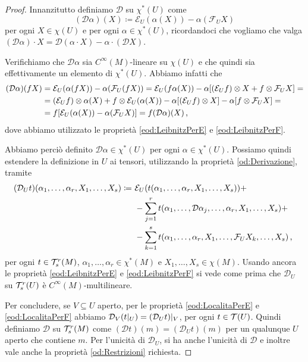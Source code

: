 \begin{proof}
	Innanzitutto definiamo $\mathcal D$ su $\chi^*(U)$ come 
	\begin{equation*}
	(\mathcal D\alpha) (X) \coloneqq \mathcal E_U(\alpha(X)) - \alpha( \mathcal F_UX)
	\end{equation*}
	per ogni $X\in\chi(U)$ e per ogni $\alpha \in \chi^*(U)$, ricordandoci che vogliamo che valga $(\mathcal D\alpha)\cdot X = \mathcal D(\alpha\cdot X) - \alpha\cdot(\mathcal D X)$.
	
	Verifichiamo che $\mathcal D\alpha$ sia $C^\infty(M)$-lineare su $\chi(U)$ e che quindi sia effettivamente un elemento di $\chi^*(U)$.
	Abbiamo infatti che
	\begin{align*}
		(\mathcal D\alpha)(fX) &= \mathcal E_U(\alpha(fX)) - \alpha(\mathcal F_U(fX))= \mathcal E_U(f\alpha (X)) - \alpha [(\mathcal E_Uf)\otimes X + f \otimes \mathcal F_UX] = \\
		&= (\mathcal E_U f)\otimes \alpha (X) + f \otimes \mathcal E_U (\alpha (X)) - \alpha [(\mathcal E_U f) \otimes X] - \alpha [f \otimes \mathcal F_U X] = \\
		&= f [\mathcal E_U (\alpha (X))- \alpha( \mathcal F_UX)] = f(\mathcal D\alpha) (X) \, \text{, }
	\end{align*}
	dove abbiamo utilizzato le proprietà \ref{eod:LeibnitzPerE} e \ref{eod:LeibnitzPerF}.
	
	Abbiamo perciò definito $\mathcal D\alpha \in \chi^*(U)$ per ogni $\alpha\in\chi^*(U)$. Possiamo quindi estendere la definizione in $U$ ai tensori, utilizzando la proprietà \ref{od:Derivazione}, tramite 
	\begin{align*} %
		(\mathcal D_U t) (\alpha_1,\ldots,\alpha_r,X_1,\ldots,X_s) \coloneqq\ & \mathcal E_U(t(\alpha_1,\ldots,\alpha_r,X_1,\ldots,X_s)) +\\
		&-\sum_{j=1}^rt(\alpha_1,\ldots, \mathcal D\alpha_j,\ldots,\alpha_r,X_1,\ldots,X_s) +\\
		&- \sum_{k=1}^s t(\alpha_1,\ldots,\alpha_r,X_1,\ldots,\mathcal F_UX_k,\ldots,X_s)\virgola
	\end{align*}
	per ogni $t\in\mathcal T_s^r(M)$, $\alpha_1,\ldots,\alpha_r\in\chi^*(M)$ e $X_1,\ldots,X_s\in\chi(M)$.
	Usando ancora le proprietà \ref{eod:LeibnitzPerE} e \ref{eod:LeibnitzPerF} si vede come prima che $\mathcal D_U$ su $\mathcal T_s^r(U)$ è $C^\infty(M)$-multilineare.

Per concludere, se $V\subseteq U$ aperto, per le proprietà \ref{eod:LocalitaPerE} e \ref{eod:LocalitaPerF} abbiamo $\mathcal D_V(t|_ U) = (\mathcal D_U t)|_ V$, per ogni $t\in\mathcal T(U)$.
Quindi definiamo $\mathcal D$ su $\mathcal T_s^r(M)$ come $(\mathcal D t) (m) = (\mathcal D_U t) (m)$ per un qualunque $U$ aperto che contiene $m$.
Per l'unicità di $\mathcal D_U$, si ha anche l'unicità di $\mathcal D$ e inoltre vale anche la proprietà \ref{od:Restrizioni} richiesta.
\end{proof}

